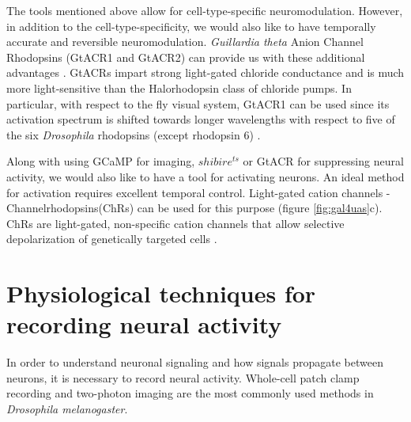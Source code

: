 The tools mentioned above allow for cell-type-specific neuromodulation. However, in addition to the cell-type-specificity, we would also like to have temporally accurate and reversible neuromodulation. \textit{Guillardia theta} Anion Channel Rhodopsins (GtACR1 and GtACR2) can provide us with these additional advantages \parencite{Govorunova2015}. GtACRs impart strong light-gated chloride conductance and is much more light-sensitive than the Halorhodopsin class of chloride pumps. In particular, with respect to the fly visual system, GtACR1 can be used since its activation spectrum is shifted towards longer wavelengths with respect to five of the six \textit{Drosophila} rhodopsins (except rhodopsin 6) \parencite{Mauss2017, Mohammad2017}. %
 
Along with using GCaMP for imaging, $shibire^{ts}$ or GtACR for suppressing neural activity, we would also like to have a tool for activating neurons. An ideal method for activation requires excellent temporal control. Light-gated cation channels - Channelrhodopsins(ChRs) can be used for this purpose (figure  \ref{fig:gal4uas}c). ChRs are light-gated, non-specific cation channels that allow selective depolarization of genetically targeted cells \parencite{Lin2013, Busch2018}. 

\section{Physiological techniques for recording neural activity}
In order to understand neuronal signaling and how signals propagate between neurons, it is necessary to record neural activity. Whole-cell patch clamp recording and two-photon imaging are the most commonly used methods in \textit{Drosophila melanogaster}.


